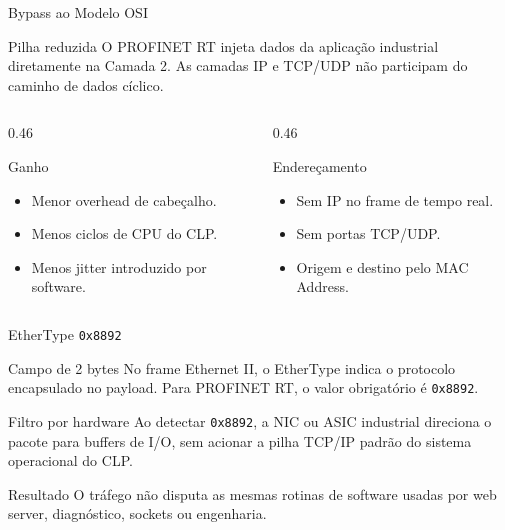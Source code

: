 \documentclass[10pt, aspectratio=169]{beamer}
\begin{document}
\begin{frame}{Bypass ao Modelo OSI}
    \small
    \begin{block}{Pilha reduzida}
        O PROFINET RT injeta dados da aplica\c{c}\~ao industrial diretamente na Camada 2. As camadas IP e TCP/UDP n\~ao participam do caminho de dados c\'iclico.
    \end{block}

    \begin{columns}[T,totalwidth=\textwidth]
        \begin{column}{0.46\textwidth}
            \begin{block}{Ganho}
                \begin{itemize}
                    \item Menor overhead de cabe\c{c}alho.
                    \item Menos ciclos de CPU do CLP.
                    \item Menos jitter introduzido por software.
                \end{itemize}
            \end{block}
        \end{column}
        \begin{column}{0.46\textwidth}
            \begin{block}{Endere\c{c}amento}
                \begin{itemize}
                    \item Sem IP no frame de tempo real.
                    \item Sem portas TCP/UDP.
                    \item Origem e destino pelo \alert{MAC Address}.
                \end{itemize}
            \end{block}
        \end{column}
    \end{columns}
\end{frame}

\begin{frame}{EtherType \texttt{0x8892}}
    \small
    \begin{block}{Campo de 2 bytes}
        No frame Ethernet II, o EtherType indica o protocolo encapsulado no payload. Para PROFINET RT, o valor obrigat\'orio \'e \alert{\texttt{0x8892}}.
    \end{block}

    \begin{block}{Filtro por hardware}
        Ao detectar \texttt{0x8892}, a NIC ou ASIC industrial direciona o pacote para buffers de I/O, sem acionar a pilha TCP/IP padr\~ao do sistema operacional do CLP.
    \end{block}

    \begin{block}{Resultado}
        O tr\'afego n\~ao disputa as mesmas rotinas de software usadas por web server, diagn\'ostico, sockets ou engenharia.
    \end{block}
\end{frame}
\end{document}
